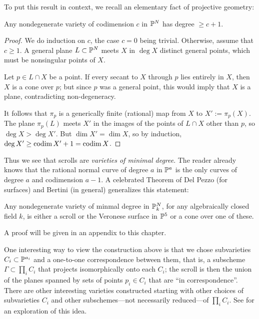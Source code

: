 To put this result in context, we recall an elementary fact of projective geometry:
 
\begin{proposition}\label{minimal degree}
 Any nondegenerate variety of codimension $c$ in $\PP^{N}$ has degree $\geq c +1$.
\end{proposition}

\begin{proof} We do induction on $c$, the case $c=0$ being trivial.
 Otherwise, assume that $c\geq1$. A general plane $L\subset \PP^{N}$ meets $X$ in $\deg X$
 distinct general points, which must be nonsingular points of $X$.
 
Let $p\in L\cap X$ be a point. If every secant to $X$ through $p$ lies entirely in $X$, then $X$ is a cone over $p$; but since $p$ was a general point, this would imply that $X$ is a plane, contradicting non-degeneracy. 

It follows that $\pi_{p}$ is a generically finite (rational) map from $X$ to $X' := \pi_{p}(X)$. The plane 
$\pi_{p}(L)$ meets $X'$ in the images of the points of $L\cap X$ other than $p$, so
$\deg X>\deg X'$. But 
$\dim X' = \dim X$, so by induction, $\deg X' \geq \codim X'+1 = \codim X$. 
\end{proof}

Thus we see that scrolls are \emph{varieties of minimal degree}. The reader already knows that the rational normal curve of degree $a$ in $\PP^{a}$ is the only curves of degree $a$ and codimension $a-1$. A celebrated Theorem of Del Pezzo (for surfaces) and Bertini (in general) generalizes this statement:

\begin{theorem}\label{classification of scrolls}
 Any nondegenerate variety of minmal degree in $\PP_{k}^{N}$, for any algebraically closed field $k$, is either a scroll or the Veronese surface in $\PP^{5}$ or a cone over one of these.
\end{theorem}

A proof will be given in an appendix to this chapter.

One interesting way to view the construction above is that we chose subvarieties $C_{i}\subset \PP^{a_{i}}$ and a one-to-one correspondence between them, that is, a subscheme
$\Gamma\subset \prod_{i}C_{i}$ that projects isomorphically onto each $C_{i}$; the scroll is then the
union of the planes spanned by sets of points $p_{i}\in C_{i}$ that are ``in correspondence''. There are other interesting varieties constructed starting with other choices of subvarieties $C_{i}$ and other subschemes---not necessarily reduced---of $\prod_{i}C_{i}$. See \cite{Eisenbud-Sammartano} for an exploration of this idea.

